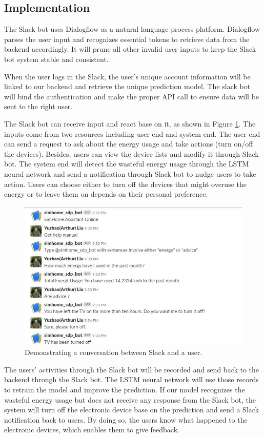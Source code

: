 \documentclass[conference]{IEEEtran}
\begin{document}
\subsection{Implementation}
The Slack bot uses Dialogflow as a natural language process platform. Dialogflow parses the user input and recognizes essential tokens to retrieve data from the backend accordingly. It will prune all other invalid user inputs to keep the Slack bot system stable and consistent.

When the user logs in the Slack, the user’s unique account information will be linked to our backend and retrieve the unique prediction model. The slack bot will bind the authentication and make the proper API call to ensure data will be sent to the right user.

The Slack bot can receive input and react base on it, as shown in Figure \ref{fig:slack}. The inputs come from two resources including user end and system end. The user end can send a request to ask about the energy usage and take actions (turn on/off the devices). Besides, users can view the device lists and modify it through Slack bot. The system end will detect the wasteful energy usage through the LSTM neural network and send a notification through Slack bot to nudge users to take action. Users can choose either to turn off the devices that might overuse the energy or to leave them on depends on their personal preference.

\begin{figure}[htbp]
    \includegraphics[width=\linewidth]{img/slack.jpg}
    \caption{Demonstrating a conversation between Slack and a user.}
    \label{fig:slack}
\end{figure}

The users’ activities through the Slack bot will be recorded and send back to the backend through the Slack bot. The LSTM neural network will use those records to retrain the model and improve the prediction. If our model recognizes the wasteful energy usage but does not receive any response from the Slack bot, the system will turn off the electronic device base on the prediction and send a Slack notification back to users. By doing so, the users know what happened to the electronic devices, which enables them to give feedback.
\end{document}
